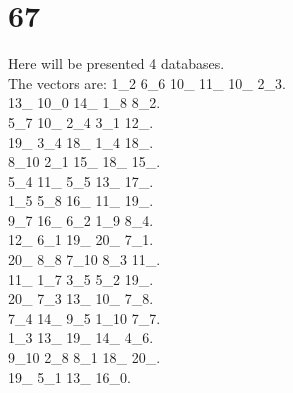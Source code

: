 \chapter{67}
\indent Here will be presented 4 databases.\\
The vectors are:
1\_2 6\_6 10\_ 11\_ 10\_ 2\_3.\\13\_ 10\_0 14\_ 1\_8 8\_2.\\5\_7 10\_ 2\_4 3\_1 12\_.\\19\_ 3\_4 18\_ 1\_4 18\_.\\8\_10 2\_1 15\_ 18\_ 15\_.\\5\_4 11\_ 5\_5 13\_ 17\_.\\1\_5 5\_8 16\_ 11\_ 19\_.\\9\_7 16\_ 6\_2 1\_9 8\_4.\\12\_ 6\_1 19\_ 20\_ 7\_1.\\20\_ 8\_8 7\_10 8\_3 11\_.\\11\_ 1\_7 3\_5 5\_2 19\_.\\20\_ 7\_3 13\_ 10\_ 7\_8.\\7\_4 14\_ 9\_5 1\_10 7\_7.\\1\_3 13\_ 19\_ 14\_ 4\_6.\\9\_10 2\_8 8\_1 18\_ 20\_.\\19\_ 5\_1 13\_ 16\_0.\\